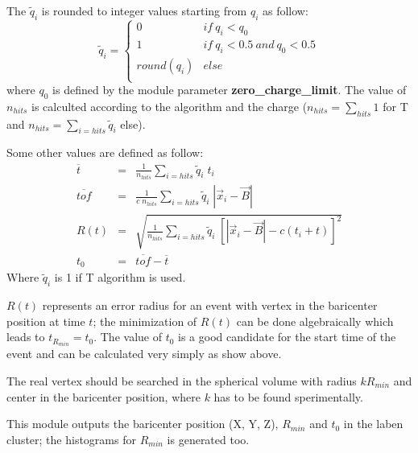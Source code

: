 The $\tilde{q}_i$ is rounded to integer values starting from $q_i$ as follow: 
\[\tilde{q}_i = \left\{ \begin{array}{ll} 
0 & if\ q_i < q_0 \\
1 & if\ q_i < 0.5\ and\ q_0 < 0.5 \\
round(q_i) & else \\
\end{array}\right.\] 
where $q_0$ is defined by the module parameter {\bf zero\_charge\_limit}. The value of $n_{hits}$ is calculted
according to the algorithm and the charge ($n_{hits} = \sum_{hits} 1$ for T and $n_{hits} = \sum_{i=hits} \tilde{q}_i$ else).

\vskip 2mm
Some other values are defined as follow:
\begin{eqnarray}
\overline{t} & = & \frac{1}{n_{hits}}\sum_{i = hits}\tilde{q}_i\; t_i \\
\overline{tof} & = & \frac{1}{c\; n_{hits}} \sum_{i = hits} \tilde{q}_i\; |\vec{x}_i - \vec{B}| \\
R(t) & = & \sqrt{\frac{1}{n_{hits}}\sum_{i=hits} \tilde{q}_i \; \left[|\vec{x}_i - \vec{B}| - c(t_i + t)\right]^2} \\
t_0 & = & \overline{tof} - \overline{t}
\end{eqnarray}
Where $\tilde{q}_i$ is 1 if T algorithm is used.

$R(t)$ represents an error radius for an event with vertex in the baricenter position at time $t$;
the minimization of $R(t)$ can be done algebraically which leads to $t_{R_{min}} = t_0$. The value of
$t_0$ is a good candidate for the start time of the event and can be calculated very simply as show above.

The real vertex should be searched in the spherical volume with radius $k R_{min}$ and center in the baricenter position, 
where $k$ has to be found sperimentally.


\vskip 2mm
This module outputs the baricenter position (X, Y, Z), $R_{min}$ and $t_0$ in the laben cluster; the histograms
for $R_{min}$ is generated too.





